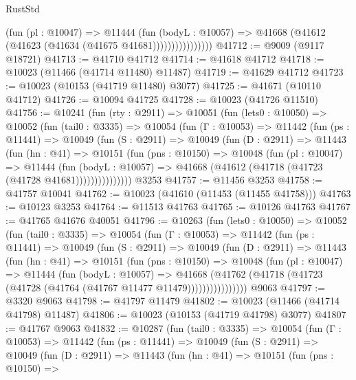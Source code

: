 \begin{lexlean}{RustStd}
\begin{coremodule}
                        (fun (pl : @10047) =>
                        @11444
                          (fun (bodyL : @10057) =>
                          @41668 (@41612 (@41623 (@41634 (@41675 @41681))))))))))))))))
@41712 := @9009 (@9117 @18721)
@41713 := @41710 @41712
@41714 := @41618 @41712
@41718 := @10023 (@11466 (@41714 @11480) @11487)
@41719 := @41629 @41712
@41723 := @10023 (@10153 (@41719 @11480) @3077)
@41725 := @41671 (@10110 @41712)
@41726 := @10094 @41725
@41728 := @10023 (@41726 @11510)
@41756 := @10241
    (fun (rty : @2911) =>
    @10051
      (fun (lets0 : @10050) =>
      @10052
        (fun (tail0 : @3335) =>
        @10054
          (fun (Γ : @10053) =>
          @11442
            (fun (ps : @11441) =>
            @10049
              (fun (S : @2911) =>
              @10049
                (fun (D : @2911) =>
                @11443
                  (fun (hn : @41) =>
                  @10151
                    (fun (pns : @10150) =>
                    @10048
                      (fun (pl : @10047) =>
                      @11444
                        (fun (bodyL : @10057) =>
                        @41668 (@41612 (@41718 (@41723 (@41728 @41681)))))))))))))))
    @3253
@41757 := @11456 @3253
@41758 := @41757 @10041
@41762 := @10023 (@41610 (@11453 (@11455 @41758)))
@41763 := @10123 @3253
@41764 := @11513 @41763
@41765 := @10126 @41763
@41767 := @41765 @41676 @40051
@41796 := @10263
    (fun (lets0 : @10050) =>
    @10052
      (fun (tail0 : @3335) =>
      @10054
        (fun (Γ : @10053) =>
        @11442
          (fun (ps : @11441) =>
          @10049
            (fun (S : @2911) =>
            @10049
              (fun (D : @2911) =>
              @11443
                (fun (hn : @41) =>
                @10151
                  (fun (pns : @10150) =>
                  @10048
                    (fun (pl : @10047) =>
                    @11444
                      (fun (bodyL : @10057) =>
                      @41668
                        (@41762
                          (@41718 (@41723 (@41728 (@41764 (@41767 @11477 @11479))))))))))))))))
    @9063
@41797 := @3320 @9063
@41798 := @41797 @11479
@41802 := @10023 (@11466 (@41714 @41798) @11487)
@41806 := @10023 (@10153 (@41719 @41798) @3077)
@41807 := @41767 @9063
@41832 := @10287
    (fun (tail0 : @3335) =>
    @10054
      (fun (Γ : @10053) =>
      @11442
        (fun (ps : @11441) =>
        @10049
          (fun (S : @2911) =>
          @10049
            (fun (D : @2911) =>
            @11443
              (fun (hn : @41) =>
              @10151
                (fun (pns : @10150) =>

\end{coremodule}
\end{lexlean}
